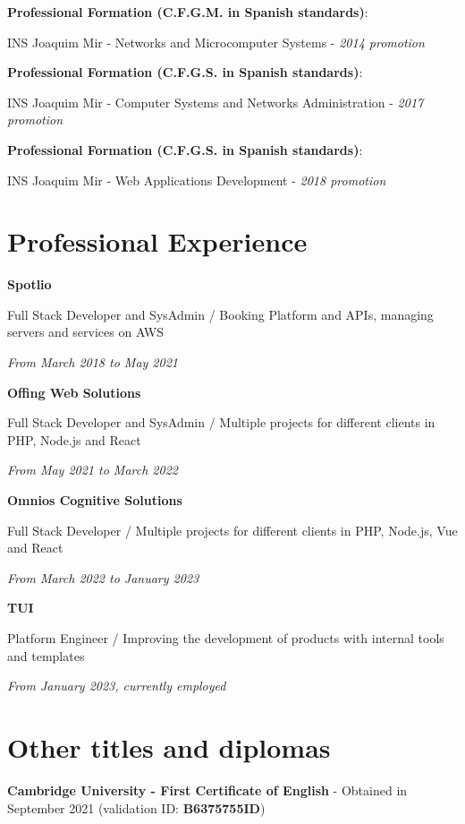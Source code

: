 \documentclass{article}
\newcommand\tab[1][0.5cm]{\hspace*{#1}}
\newcommand{\nl}{\vspace{3mm}}
\begin{document}
{	\textbf{Professional Formation (C.F.G.M. in Spanish standards)}:
	
	\tab INS Joaquim Mir - Networks and Microcomputer Systems - \textit{2014 promotion}
	
	\nl
	\textbf{Professional Formation (C.F.G.S. in Spanish standards)}:
	
	\tab INS Joaquim Mir - Computer Systems and Networks Administration - \textit{2017 promotion}
	
	\nl
	\textbf{Professional Formation (C.F.G.S. in Spanish standards)}:
	
	\tab INS Joaquim Mir - Web Applications Development - \textit{2018 promotion}

	\section*{Professional Experience}

	\nl
	\textbf{Spotlio}
	
	\tab Full Stack Developer and SysAdmin / Booking Platform and APIs, managing servers and services on AWS
	
	\tab \textit{From March 2018 to May 2021}
	
	\nl
	\textbf{Offing Web Solutions}
	
	\tab Full Stack Developer and SysAdmin / Multiple projects for different clients in PHP, Node.js and React
	
	\tab \textit{From May 2021 to March 2022}
	
	\nl
	\textbf{Omnios Cognitive Solutions}
	
	\tab Full Stack Developer / Multiple projects for different clients in PHP, Node.js, Vue and React
	
	\tab \textit{From March 2022 to January 2023}
	
	\nl
	\textbf{TUI}
	
	\tab Platform Engineer / Improving the development of products with internal tools and templates
	
	\tab \textit{From January 2023, currently employed}
	
	\section*{Other titles and diplomas}
	
	\textbf{Cambridge University - First Certificate of English} - Obtained in September 2021 (validation ID: \textbf{B6375755ID})
	
}
\end{document}
